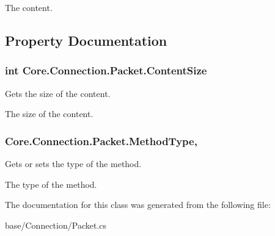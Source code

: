 The content.

\subsection{Property Documentation}
\hypertarget{classCore_1_1Connection_1_1Packet_a78e8987a205544dffdd0b80a4277cd38}{}
\subsubsection[{Content\+Size}]{\setlength{\rightskip}{0pt plus 5cm}int Core.\+Connection.\+Packet.\+Content\+Size\hspace{0.3cm}{\ttfamily [get]}}\label{classCore_1_1Connection_1_1Packet_a78e8987a205544dffdd0b80a4277cd38}


Gets the size of the content. 

The size of the content.\hypertarget{classCore_1_1Connection_1_1Packet_a3a1285f0e02eb5a238b7195c36e16fbd}{}
\subsubsection[{Method\+Type}]{ Core.\+Connection.\+Packet.\+Method\+Type\hspace{0.3cm}{\ttfamily [get]}, {\ttfamily [set]}}\label{classCore_1_1Connection_1_1Packet_a3a1285f0e02eb5a238b7195c36e16fbd}


Gets or sets the type of the method. 

The type of the method.

The documentation for this class was generated from the following file\+:\begin{DoxyCompactItemize}
\item 
base/\+Connection/Packet.\+cs\end{DoxyCompactItemize}
